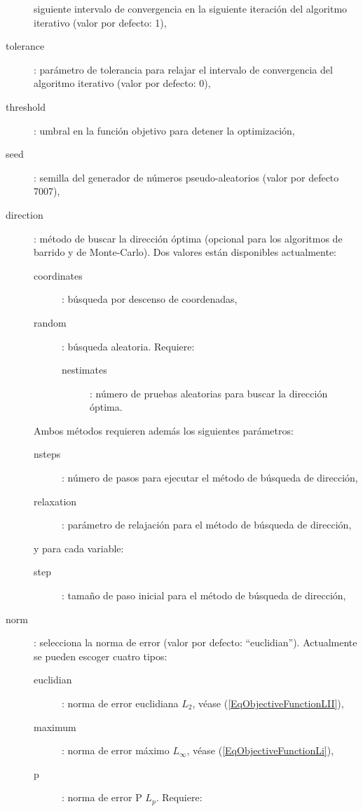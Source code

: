 \documentclass[a4paper]{report}
\begin{document}
\begin{description}
		siguiente intervalo de convergencia en la siguiente iteración del
		algoritmo iterativo (valor por defecto: 1),
	\item[tolerance]: parámetro de tolerancia para relajar el intervalo de
		convergencia del algoritmo iterativo (valor por defecto: 0),
	\item[threshold]: umbral en la función objetivo para detener la
		optimización,
	\item[seed]: semilla del generador de números pseudo-aleatorios (valor por
		defecto 7007),
	\item[direction]: método de buscar la dirección óptima (opcional para los
		algoritmos de barrido y de Monte-Carlo). Dos valores están disponibles
		actualmente:
	\begin{description}
		\item[coordinates]: búsqueda por descenso de coordenadas,
		\item[random]: búsqueda aleatoria. Requiere:
		\begin{description}
			\item[nestimates]: número de pruebas aleatorias para buscar la
				dirección óptima.
		\end{description}
	\end{description}
	Ambos métodos requieren además los siguientes parámetros:
	\begin{description}
		\item[nsteps]: número de pasos para ejecutar el método de búsqueda de
			dirección,
		\item[relaxation]: parámetro de relajación para el método de búsqueda de
			dirección,
	\end{description}
	y para cada variable:
	\begin{description}
		\item[step]: tamaño de paso inicial para el método de búsqueda de
			dirección,
	\end{description}
	\item[norm]: selecciona la norma de error (valor por defecto:
		``euclidian''). Actualmente se pueden escoger cuatro tipos:
		\begin{description}
			\item[euclidian]: norma de error euclidiana $L_2$, véase
				(\ref{EqObjectiveFunctionLII}),
			\item[maximum]: norma de error máximo $L_\infty$, véase
				(\ref{EqObjectiveFunctionLi}),
			\item[p]: norma de error P $L_p$. Requiere:
			\begin{description}

\end{description}
\end{description}
\end{description}
\end{document}
